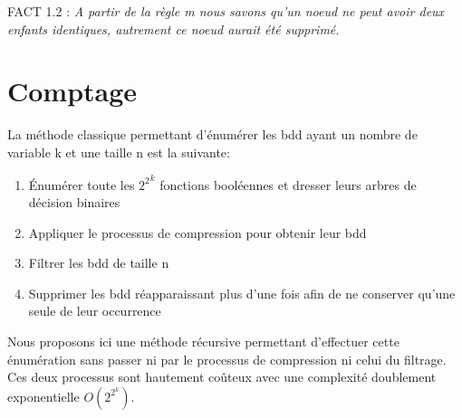 \documentclass[french]{article}
\begin{document}
FACT 1.2 : \emph{A partir de la règle m nous savons qu'un noeud ne peut avoir deux enfants identiques, autrement ce noeud aurait été supprimé.}

\section{Comptage}
La méthode classique permettant d'énumérer les bdd ayant un nombre de variable k et une taille n est la suivante:
\begin{enumerate}
    \item 
	Énumérer toute les \({2^2}^k\) fonctions booléennes et dresser leurs arbres de décision binaires
	\item
	Appliquer le processus de compression pour obtenir leur bdd
	\item
    Filtrer les bdd de taille n
	\item
	Supprimer les bdd réapparaissant plus d'une fois afin de ne conserver qu'une seule de leur occurrence
\end{enumerate}
Nous proposons ici une méthode récursive permettant d'effectuer cette énumération sans passer ni par le processus de compression ni celui du filtrage. Ces deux processus sont hautement coûteux avec une complexité doublement exponentielle \(O(2^{2^{k}})\).
\vspace{5mm} 
\end{document}
